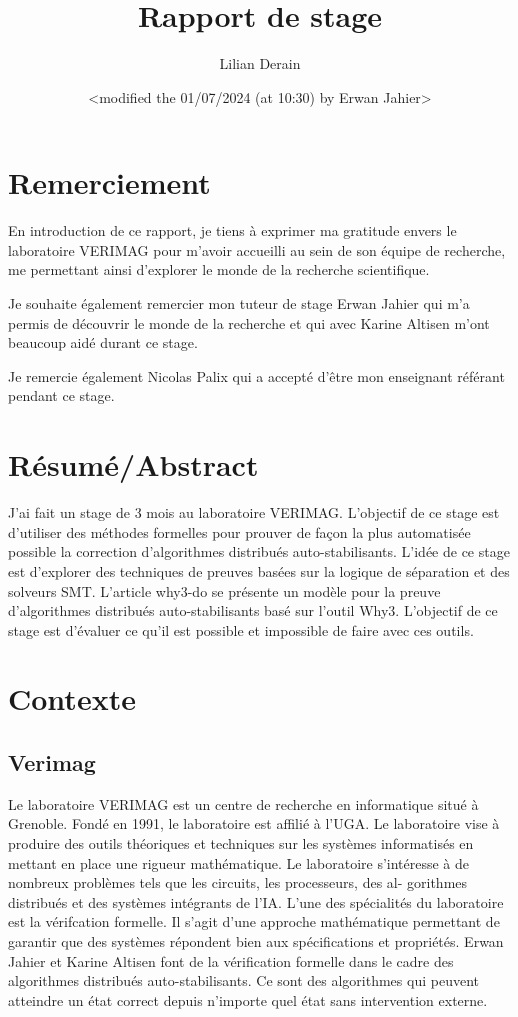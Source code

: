 \documentclass[11pt]{article}
\author{Lilian Derain}
\date{<modified the 01/07/2024 (at 10:30) by Erwan Jahier>}
\title{Rapport de stage}
\begin{document}
\section{Remerciement}
\label{sec:orge670bc7}
  En introduction de ce rapport, je tiens à exprimer ma gratitude envers le laboratoire
VERIMAG pour m’avoir accueilli au sein de son équipe de recherche, me
permettant ainsi d’explorer le monde de la recherche scientifique.

Je souhaite également remercier mon tuteur de stage Erwan Jahier qui m'a permis de découvrir le 
monde de la recherche et qui avec Karine Altisen m'ont beaucoup aidé durant ce stage.

Je remercie également Nicolas Palix qui a accepté d’être mon enseignant référant pendant
ce stage. 


\section{Résumé/Abstract}
\label{sec:org5e5b21f}
  J'ai fait un stage de 3 mois au laboratoire  VERIMAG. 
  L'objectif de ce stage est d'utiliser des méthodes formelles pour prouver de façon la plus automatisée possible la correction d'algorithmes distribués auto-stabilisants.
  L'idée de ce stage est d'explorer des techniques de preuves
basées sur la logique de séparation et  des solveurs SMT. 
  L'article why3-do se présente un modèle 
pour la preuve d'algorithmes distribués auto-stabilisants basé sur l'outil Why3.  
  L'objectif de ce stage  est d'évaluer ce qu'il est possible et impossible de faire avec ces outils.

\section{Contexte}
\label{sec:orgd884884}

\subsection{Verimag}
\label{sec:org5bd5243}

   Le laboratoire VERIMAG est un centre de recherche en informatique situé à Grenoble. Fondé
en 1991, le laboratoire est affilié à l’UGA. Le laboratoire vise à produire des outils théoriques
et techniques sur les systèmes informatisés en mettant en place une rigueur mathématique.
Le laboratoire s'intéresse à  de nombreux problèmes tels que les circuits, les processeurs, des al-
gorithmes distribués et des systèmes intégrants de l’IA.
L’une des spécialités du laboratoire est la vérifcation formelle. Il s’agit d’une approche
mathématique permettant de garantir que des systèmes répondent bien aux spécifications
et propriétés. Erwan Jahier et Karine Altisen font de la vérification formelle dans le 
cadre des algorithmes distribués auto-stabilisants. Ce sont des algorithmes qui peuvent 
atteindre un état correct depuis n'importe quel état sans intervention externe.
\end{document}
